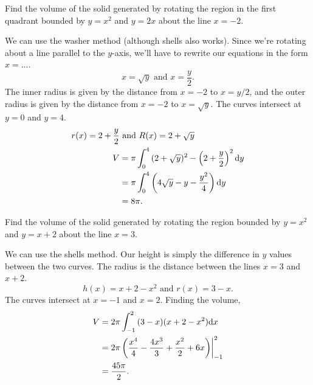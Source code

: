 \begin{example}
	Find the volume of the solid generated by rotating the region in the first quadrant bounded by $y=x^2$ and $y=2x$ about the line $x=-2$.
\end{example}
We can use the washer method (although shells also works).
Since we're rotating about a line parallel to the $y$-axis, we'll have to rewrite our equations in the form $x=\ldots$.
\begin{equation*}
	x = \sqrt{y} \text{ and } x = \frac{y}{2}.
\end{equation*}
\indent
The inner radius is given by the distance from $x=-2$ to $x=y/2$, and the outer radius is given by the distance from $x=-2$ to $x=\sqrt{y}$.
The curves intersect at $y=0$ and $y=4$.
\begin{align*}
	r(x) = 2 + \frac{y}{2} &\text{ and } R(x) = 2 + \sqrt{y} \\
	V &= \pi\int_{0}^{4}{(2+\sqrt{y})^2-\left(2+\frac{y}{2}\right)^2\mathrm{d} y} \\
	&= \pi\int_{0}^{4}{\left(4\sqrt{y}-y-\frac{y^2}{4}\right)\mathrm{d} y} \\
	&= 8\pi.
\end{align*}

\begin{example}
	Find the volume of the solid generated by rotating the region bounded by $y=x^2$ and $y=x+2$ about the line $x=3$.
\end{example} 
We can use the shells method.
Our height is simply the difference in $y$ values between the two curves.
The radius is the distance between the lines $x=3$ and $x+2$.
\begin{equation*}
	h(x) = x+2-x^2 \text{ and } r(x) = 3-x.
\end{equation*}
\indent
The curves intersect at $x=-1$ and $x=2$.
Finding the volume,
\begin{align*}
	V &= 2\pi\int_{-1}^{2}{(3-x)(x+2-x^2)\mathrm{d} x} \\
	&= 2\pi\left(\frac{x^4}{4}-\frac{4x^3}{3}+\frac{x^2}{2}+6x\right)\biggr\rvert_{-1}^{2} \\
	&= \frac{45\pi}{2}.
\end{align*}

